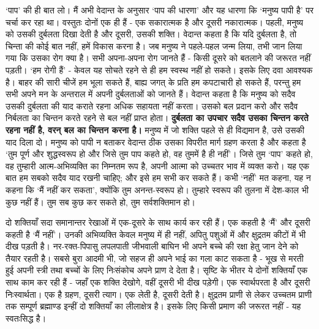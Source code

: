 ‘पाप’ की ही बात लो। मैं अभी वेदान्त के अनुसार ‘पाप की धारणा’ और यह धारणा कि ‘मनुष्य पापी है’ पर चर्चा कर रहा था। वस्तुतः दोनों एक ही हैं - एक सकारात्मक है और दूसरी नकारात्मक। पहली, मनुष्य को उसकी दुर्बलता दिखा देती है और दूसरी, उसकी शक्ति। वेदान्त कहता है कि यदि दुर्बलता है, तो चिन्ता की कोई बात नहीं, हमें विकास करना है। जब मनुष्य ने पहले-पहल जन्म लिया, तभी जान लिया गया कि उसका रोग क्या है। सभी अपना-अपना रोग जानते हैं - किसी दूसरे को बतलाने की जरूरत नहीं पड़ती। ‘हम रोगी हैं’ - केवल यह सोचते रहने से ही हम स्वस्थ नहीं हो सकते। इसके लिए दवा आवश्यक है। बाहर की सारी चीजें हम भूला सकते हैं, बाह्य जगत् के प्रति हम कपटाचारी हो सकते हैं, परन्तु हम सभी अपने मन के अन्तराल में अपनी दुर्बलताओं को जानते हैं। वेदान्त कहता है कि मनुष्य को सदैव उसकी दुर्बलता की याद कराते रहना अधिक सहायता नहीं करता। उसको बल प्रदान करो और सदैव निर्बलता का चिन्तन करते रहने से बल नहीं प्राप्त होता। \textbf{दुर्बलता का उपचार सदैव उसका चिन्तन करते रहना नहीं है, वरन् बल का चिन्तन करना है। } मनुष्य में जो शक्ति पहले से ही विद्यमान है, उसे उसकी याद दिला दो। मनुष्य को पापी न बताकर वेदान्त ठीक उसका विपरीत मार्ग ग्रहण करता है और कहता है ‘तुम पूर्ण और शुद्धस्वरूप हो और जिसे तुम पाप कहते हो, वह तुममें है ही नहीं’। जिसे तुम ‘पाप’ कहते हो, वह तुम्हारी आत्म-अभिव्यक्ति का निम्नतम रूप है, अपनी आत्मा को उच्चतर भाव में व्यक्त करो। यह एक बात हम सबको सदैव याद रखनी चाहिए; और इसे हम सभी कर सकते हैं। कभी ‘नहीं’ मत कहना, यह न कहना कि ‘मैं नहीं कर सकता’, क्योंकि तुम अनन्त-स्वरूप हो। तुम्हारे स्वरूप की तुलना में देश-काल भी कुछ नहीं हैं। तुम सब कुछ कर सकते हो, तुम सर्वशक्तिमान हो। 

दो शक्तियाँ सदा समानान्तर रेखाओं में एक-दूसरे के साथ कार्य कर रही हैं। एक कहती है ‘मैं’ और दूसरी कहती है ‘मैं नहीं’। उनकी अभिव्यक्ति केवल मनुष्य में ही नहीं, अपितु पशुओं में और क्षुद्रतम कीटों में भी दीख पड़ती है। नर-रक्त-पिपासु लपलपाती जीभवाली बाघिन भी अपने बच्चे की रक्षा हेतु जान देने को तैयार रहती है। सबसे बुरा आदमी भी, जो सहज ही अपने भाई का गला काट सकता है - भूख से मरती हुई अपनी स्त्री तथा बच्चों के लिए निःसंकोच अपने प्राण दे देता है। सृष्टि के भीतर ये दोनों शक्तियाँ एक साथ काम कर रही हैं - जहाँ एक शक्ति देखोगे, वहीं दूसरी भी दीख पड़ेगी। एक स्वार्थपरता है और दूसरी निःस्वार्थता। एक है ग्रहण, दूसरी त्याग। एक लेती है, दूसरी देती है। क्षुद्रतम प्राणी से लेकर उच्चतम प्राणी तक सम्पूर्ण ब्रह्माण्ड इन्हीं दो शक्तियाँ का लीलाक्षेत्र है। इसके लिए किसी प्रमाण की जरूरत नहीं - यह स्वतःसिद्ध है। 

